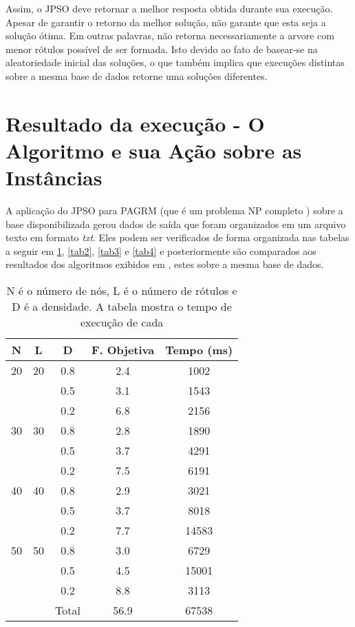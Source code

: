 \documentclass{sig-alternate-05-2015}
\begin{document}
Assim, o JPSO deve retornar a melhor resposta obtida durante sua execução. Apesar de garantir o retorno da melhor solução, não garante que esta seja a solução ótima. Em outras palavras, não retorna necessariamente a arvore com menor rótulos possível de ser formada. Isto devido ao fato de basear-se na aleatoriedade inicial das soluções, o que também implica que execuções distintas sobre a mesma base de dados retorne uma soluções diferentes.

\section*{Resultado da execução - O Algoritmo e sua Ação sobre as Instâncias} \label{sec4}
A aplicação do JPSO para PAGRM (que é um problema NP completo \cite{}) sobre a base disponibilizada gerou dados de saída que foram organizados em um arquivo texto em formato \textit{txt}. Eles podem ser verificados de forma organizada nas tabelas a seguir em \ref{tab1}, \ref{tab2}, \ref{tab3} e \ref{tab4} e posteriormente são comparados aos resultados dos algoritmos exibidos em \cite{}, estes sobre a mesma base de dados. 
\begin{table}[!h]
	

\begin{tabular}{ccccc}

	\hline \rule[-2ex]{0pt}{5.5ex} N & L & D & F. Objetiva & Tempo (ms) \\ 
	\hline \rule[-2ex]{0pt}{5.5ex} 20 & 20 & 0.8 & 2.4 & 1002 \\ 
	 \rule[-2ex]{0pt}{5.5ex}  &  & 0.5 & 3.1 & 1543 \\ 
	 \rule[-2ex]{0pt}{5.5ex}  &  & 0.2 & 6.8 & 2156 \\ 
	 \rule[-2ex]{0pt}{5.5ex} 30 & 30 & 0.8 & 2.8 & 1890 \\ 
	 \rule[-2ex]{0pt}{5.5ex}  &  & 0.5 & 3.7 & 4291 \\ 
	 \rule[-2ex]{0pt}{5.5ex}  &  & 0.2 & 7.5 & 6191 \\ 
	 \rule[-2ex]{0pt}{5.5ex} 40 & 40 & 0.8 & 2.9 & 3021 \\ 
	 \rule[-2ex]{0pt}{5.5ex}  &  & 0.5 & 3.7 & 8018 \\ 
	 \rule[-2ex]{0pt}{5.5ex}  &  & 0.2 & 7.7 & 14583 \\ 
	 \rule[-2ex]{0pt}{5.5ex} 50 & 50 & 0.8 & 3.0 & 6729 \\ 
	 \rule[-2ex]{0pt}{5.5ex}  &  & 0.5 & 4.5 & 15001 \\ 
	 \rule[-2ex]{0pt}{5.5ex}  &  & 0.2 & 8.8 & 3113 \\ 
	\hline \rule[-2ex]{0pt}{5.5ex}  &  & Total & 56.9 & 67538 \\ 
	\hline 
\end{tabular} 

\caption{N é o número de nós, L é o número de rótulos e D é a densidade.  A tabela mostra o tempo de execução de cada}
\label{tab1}
\end{table}
\end{document}
